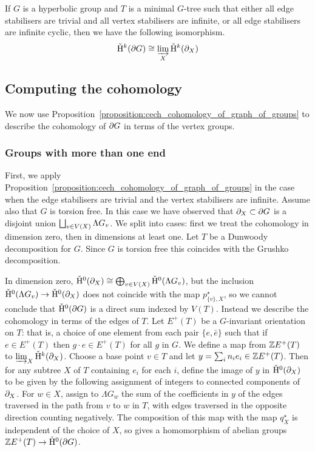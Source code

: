 \begin{proposition}\label{proposition:cech_cohomology_of_graph_of_groups}
  If $G$ is a hyperbolic group and $T$ is a minimal $G$-tree such that either all edge stabilisers are trivial and all vertex stabilisers are infinite, or all edge stabilisers are infinite cyclic, then we have the following isomorphism.
  \begin{align}
    \check{\mathrm{H}}{}^k(\partial G) \cong \varinjlim_X \check{\mathrm{H}}{}^k(\partial_X)
  \end{align}
\end{proposition}

\subsection{Computing the cohomology}

We now use Proposition~\ref{proposition:cech_cohomology_of_graph_of_groups} to describe the cohomology of $\partial G$ in terms of the vertex groups.

\subsubsection{Groups with more than one end}

First, we apply Proposition~\ref{proposition:cech_cohomology_of_graph_of_groups} in the case when the edge stabilisers are trivial and the vertex stabilisers are infinite.
Assume also that $G$ is torsion free.
In this case we have observed that $\partial_X\subset \partial G$ is a disjoint union $\bigsqcup_{v \in V(X)} \Lambda G_v$.
We split into cases: first we treat the cohomology in dimension zero, then in dimensions at least one.
Let $T$ be a Dunwoody decomposition for $G$. Since $G$ is torsion free this coincides with the Grushko decomposition.

In dimension zero, $\check{\mathrm{H}}{}^0(\partial_X) \cong \bigoplus_{v \in V(X)} \check{\mathrm{H}}{}^0(\Lambda G_v)$, but the inclusion $\check{\mathrm{H}}{}^0(\Lambda G_v) \to \check{\mathrm{H}}{}^0(\partial_X)$ does not coincide with the map $p_{\{v\}, X}^\star$, so we cannot conclude that $\check{\mathrm{H}}{}^0(\partial G)$ is a direct sum indexed by $V(T)$.
Instead we describe the cohomology in terms of the edges of $T$.
Let $E^{+}(T)$ be a $G$-invariant orientation on $T$: that is, a choice of one element from each pair $\{e, \bar{e}\}$ such that if $e \in E^{+}(T)$ then $g\cdot e \in E^{+}(T)$ for all $g$ in $G$.
We define a map from $\mathbb{Z} E^{+}(T)$ to $\varinjlim_X \check{\mathrm{H}}{}^k(\partial_X)$.
Choose a base point $v \in T$ and let $y = \sum_i n_i e_i \in \mathbb{Z} E^{+}(T)$.
Then for any subtree $X$ of $T$ containing $e_i$ for each $i$, define the image of $y$ in $\check{\mathrm{H}}{}^0(\partial_X)$ to be given by the following assignment of integers to connected components of $\partial_X$.
For $w \in X$, assign to $\Lambda G_w$ the sum of the coefficients in $y$ of the edges traversed in the path from $v$ to $w$ in $T$, with edges traversed in the opposite direction counting negatively.
The composition of this map with the map $q_X^\star$ is independent of the choice of $X$, so gives a homomorphism of abelian groups $\mathbb{Z} E^{+}(T) \to \check{\mathrm{H}}{}^0(\partial G)$.


